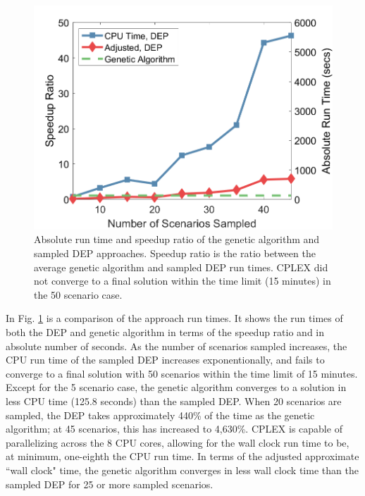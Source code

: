 \documentclass[conference]{IEEEtran}
\begin{document}
\begin{figure}
	\centering
	\includegraphics[width=.45\textwidth]{Figures/VOSGA_SpeedupRatio_AbsComp_alpha20}
	\caption{\small Absolute run time and speedup ratio of the genetic algorithm and sampled DEP approaches.  Speedup ratio is the ratio between the average genetic algorithm and sampled DEP run times.  CPLEX did not converge to a final solution within the time limit (15 minutes) in the 50 scenario case.}
	\label{fig:AlgSpeedupRunTime}
\end{figure}

In Fig. \ref{fig:AlgSpeedupRunTime} is a comparison of the approach run times.  It shows the run times of both the DEP and genetic algorithm in terms of the speedup ratio and in absolute number of seconds.  As the number of scenarios sampled increases, the CPU run time of the sampled DEP increases exponentionally, and fails to converge to a final solution with 50 scenarios within the time limit of 15 minutes.  Except for the 5 scenario case, the genetic algorithm converges to a solution in less CPU time (125.8 seconds) than the sampled DEP.  When 20 scenarios are sampled, the DEP takes approximately 440\% of the time as the genetic algorithm; at 45 scenarios, this has increased to 4,630\%.  CPLEX is capable of parallelizing across the 8 CPU cores, allowing for the wall clock run time to be, at minimum, one-eighth the CPU run time.  In terms of the adjusted approximate ``wall clock" time, the genetic algorithm converges in less wall clock time than the sampled DEP for 25 or more sampled scenarios.
\end{document}
